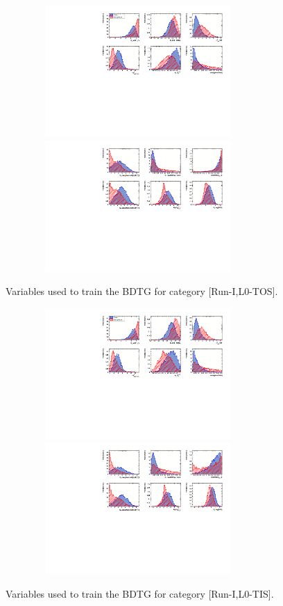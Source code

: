 \setcounter{figure}{0}
\setcounter{table}{0}

\renewcommand{\thefigure}{A.\arabic{figure}}

\begin{figure}[h]
\centering
\includegraphics[height=5cm,width=0.9\textwidth]{figs/TMVA/BDTG_Data_run1_t0_all/variables_id_c1.pdf}
\includegraphics[height=5cm,width=0.9\textwidth]{figs/TMVA/BDTG_Data_run1_t0_all/variables_id_c2.pdf}
\caption{Variables used to train the BDTG for category [Run-I,\textsf{L0-TOS}].}
\label{fig:}
\includegraphics[height=5cm,width=0.9\textwidth]{figs/TMVA/BDTG_Data_run1_t1_all/variables_id_c1.pdf}
\includegraphics[height=5cm,width=0.9\textwidth]{figs/TMVA/BDTG_Data_run1_t1_all/variables_id_c2.pdf}
\caption{Variables used to train the BDTG for category [Run-I,\textsf{L0-TIS}].}
\label{fig:}
\end{figure}

